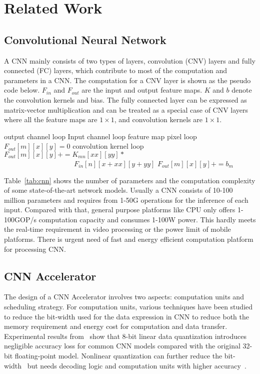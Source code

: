 \section{Related Work}\label{sec:related}


\subsection{Convolutional Neural Network}
A CNN mainly consists of two types of layers, convolution (CNV) layers and fully connected (FC) layers, which contribute to most of the computation and parameters in a CNN. The computation for a CNV layer is shown as the pseudo code below. $F_{in}$ and $F_{out}$ are the input and output feature maps. $K$ and $b$ denote the convolution kernels and bias. The fully connected layer can be expressed as matrix-vector multiplication and can be treated as a special case of CNV layers where all the feature maps are $1\times 1$, and convolution kernels are $1\times 1$.

\begin{codebox}
\li {} \Comment output channel loop
  \Do
\li   {} \Comment Input channel loop
    \Do
\li  	\Comment feature map pixel loop
\li 	{}
    \Do
\li   	  $F_{out}[m][x][y]=0$
\li 	  \Comment convolution kernel loop
\li 	  {}
          \Do
\li 		$F_{out}[m][x][y] += K_{mn}[xx][yy]*$\\
      $\qquad\qquad\qquad\qquad\qquad F_{in}[n][x+xx][y+yy] $
          \End
\li 	  $F_{out}[m][x][y]+=b_m$
        \End 
    \End
    \End 
\end{codebox}

Table~\ref{tab:cnn} shows the number of parameters and the computation complexity of some state-of-the-art network models. Usually a CNN consists of 10-100 million parameters and requires from 1-50G operations for the inference of each input. Compared with that, general purpose platforms like CPU only offers 1-100GOP/s computation capacity and consumes 1-100W power. This hardly meets the real-time requirement in video processing or the power limit of mobile platforms. There is urgent need of fast and energy efficient computation platform for processing CNN.



\subsection{CNN Accelerator}
The design of a CNN Accelerator involves two aspects: computation units and scheduling strategy. For computation units, various techniques have been studied to reduce the bit-width used for the data expression in CNN to reduce both the memory requirement and energy cost for computation and data transfer. Experimental results from~\cite{guo2017software} show that 8-bit linear data quantization introduces negligible accuracy loss for common CNN models compared with the original 32-bit floating-point model. Nonlinear quantization can further reduce the bit-width~\cite{han2015deep} but needs decoding logic and computation units with higher accuracy~\cite{eie}.

